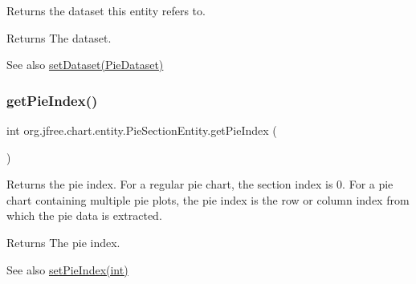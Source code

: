 Returns the dataset this entity refers to.

\begin{DoxyReturn}{Returns}
The dataset.
\end{DoxyReturn}
\begin{DoxySeeAlso}{See also}
\mbox{\hyperlink{classorg_1_1jfree_1_1chart_1_1entity_1_1_pie_section_entity_aac16216f75526ce76572bb6c4ea9d5b9}{set\+Dataset(\+Pie\+Dataset)}} 
\end{DoxySeeAlso}
\mbox{\label{classorg_1_1jfree_1_1chart_1_1entity_1_1_pie_section_entity_a07ea4f8cc4f44a495c95ae2e594bc5ff}} 
\subsubsection{\texorpdfstring{get\+Pie\+Index()}{getPieIndex()}}
{\footnotesize\ttfamily int org.\+jfree.\+chart.\+entity.\+Pie\+Section\+Entity.\+get\+Pie\+Index (\begin{DoxyParamCaption}{ }\end{DoxyParamCaption})}

Returns the pie index. For a regular pie chart, the section index is 0. For a pie chart containing multiple pie plots, the pie index is the row or column index from which the pie data is extracted.

\begin{DoxyReturn}{Returns}
The pie index.
\end{DoxyReturn}
\begin{DoxySeeAlso}{See also}
\mbox{\hyperlink{classorg_1_1jfree_1_1chart_1_1entity_1_1_pie_section_entity_a2c0d0c8d6eac5eddfef4a343ddf577a5}{set\+Pie\+Index(int)}} 
\end{DoxySeeAlso}
\mbox{\label{classorg_1_1jfree_1_1chart_1_1entity_1_1_pie_section_entity_a86999ad37a7b6db83350f9b1f6abd8a7}} 
